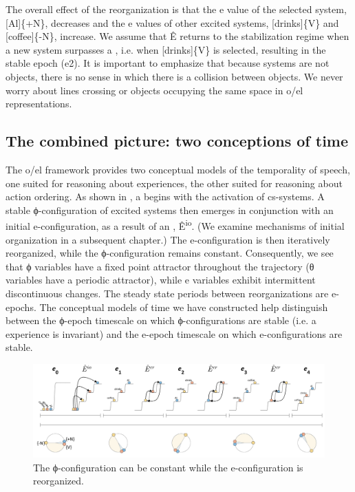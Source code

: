   The overall effect of the reorganization is that the e value of the selected system, [Al]\{+N\}, decreases and the e values of other excited systems, [drinks]\{V\} and [coffee]\{-N\}, increase. We assume that Ê returns to the stabilization regime when a new system surpasses a , i.e. when [drinks]\{V\} is selected, resulting in the stable epoch (e2). It is important to emphasize that because systems are not objects, there is no sense in which there is a collision between objects. We never worry about lines crossing or objects occupying the same space in o/el representations.

\subsection{The combined picture: two conceptions of time}

The o/el framework provides two conceptual models of the temporality of speech, one suited for reasoning about  experiences, the other suited for reasoning about action ordering. As shown in {}, a  begins with the activation of cs-systems. A stable ϕ-configuration of excited systems then emerges in conjunction with an initial e-configuration, as a result of an , Ê\textsuperscript{io}. (We examine mechanisms of initial organization in a subsequent chapter.) The e-configuration is then iteratively reorganized, while the ϕ-configuration remains constant. Consequently, we see that ϕ variables have a fixed point attractor throughout the trajectory (θ variables have a periodic attractor), while e variables exhibit intermittent discontinuous changes. The steady state periods between reorganizations are e-epochs. The conceptual models of time we have constructed help distinguish between the ϕ-epoch timescale on which ϕ-configurations are stable (i.e. a  experience is invariant) and the e-epoch timescale on which e-configurations are stable.

  
\begin{figure}
\includegraphics[width=\textwidth]{figures/Tilsen-img27.png}
\caption{The ϕ-configuration can be constant while the e-configuration is reorganized.}
\label{fig:2:20}
\end{figure}
 

